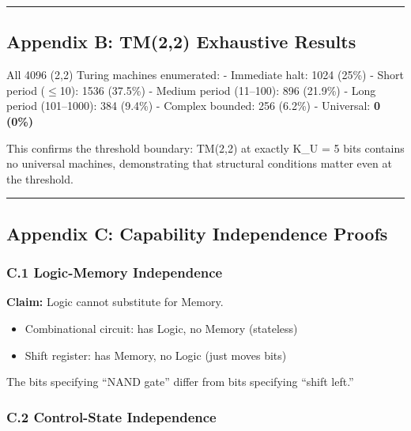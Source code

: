 \documentclass[
  11pt,
]{article}
\providecommand{\tightlist}{%
  \setlength{\itemsep}{0pt}\setlength{\parskip}{0pt}}
\begin{document}
\begin{center}\rule{0.5\linewidth}{0.5pt}\end{center}

\hypertarget{appendix-b-tm22-exhaustive-results}{%
\subsection{Appendix B: TM(2,2) Exhaustive
Results}\label{appendix-b-tm22-exhaustive-results}}

All 4096 (2,2) Turing machines enumerated: - Immediate halt: 1024 (25\%)
- Short period ($\leq$10): 1536 (37.5\%) - Medium period (11--100): 896
(21.9\%) - Long period (101--1000): 384 (9.4\%) - Complex bounded: 256
(6.2\%) - Universal: \textbf{0 (0\%)}

This confirms the threshold boundary: TM(2,2) at exactly K\_U = 5 bits
contains no universal machines, demonstrating that structural conditions
matter even at the threshold.

\begin{center}\rule{0.5\linewidth}{0.5pt}\end{center}

\hypertarget{appendix-c-capability-independence-proofs}{%
\subsection{Appendix C: Capability Independence
Proofs}\label{appendix-c-capability-independence-proofs}}

\hypertarget{c.1-logic-memory-independence}{%
\subsubsection{C.1 Logic-Memory
Independence}\label{c.1-logic-memory-independence}}

\textbf{Claim:} Logic cannot substitute for Memory.

\begin{itemize}
\tightlist
\item
  Combinational circuit: has Logic, no Memory (stateless)
\item
  Shift register: has Memory, no Logic (just moves bits)
\end{itemize}

The bits specifying ``NAND gate'' differ from bits specifying ``shift
left.''

\hypertarget{c.2-control-state-independence}{%
\subsubsection{C.2 Control-State
Independence}\label{c.2-control-state-independence}}
\end{document}
